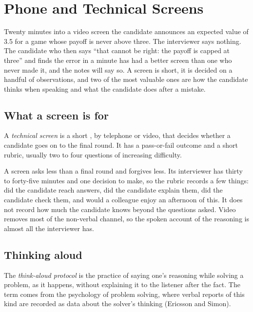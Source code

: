 \chapter{Phone and Technical Screens}\label{ch:iv:phone-and-technical-screens}

Twenty minutes into a video screen the candidate announces an expected value of 3.5 for a game whose payoff
is never above three. The interviewer says nothing. The candidate who then says ``that cannot be right: the
payoff is capped at three'' and finds the error in a minute has had a better screen than one who never made
it, and the notes will say so. A screen is short, it is decided on a handful of observations, and two of the
most valuable ones are how the candidate thinks when speaking and what the candidate does after a mistake.

\section{What a screen is for}

\begin{definition}\label{def:iv:phone-and-technical-screens:screen}
A \emph{technical screen} is a short , by telephone or video,
that decides whether a candidate goes on to the final round. It has a pass-or-fail outcome and a short
rubric, usually two to four questions of increasing difficulty.
\end{definition}

A screen asks less than a final round and forgives less. Its interviewer has thirty to forty-five minutes and
one decision to make, so the rubric records a few things: did the candidate reach answers, did the candidate
explain them, did the candidate check them, and would a colleague enjoy an afternoon of this. It does not
record how much the candidate knows beyond the questions asked. Video removes most of the non-verbal channel,
so the spoken account of the reasoning is almost all the interviewer has.

\section{Thinking aloud}

\begin{definition}\label{def:iv:phone-and-technical-screens:thinkaloud}
The \emph{think-aloud protocol} is the practice of saying one's reasoning while
solving a problem, as it happens, without explaining it to the listener after the fact. The term comes from
the psychology of problem solving, where verbal reports of this kind are recorded as data about the solver's
thinking (Ericsson and Simon).
\end{definition}

